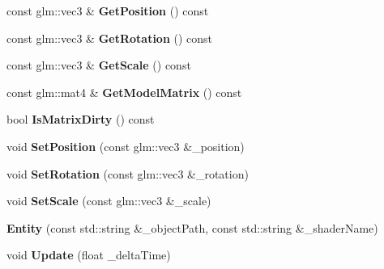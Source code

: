 \begin{DoxyCompactItemize}
\item 
\mbox{\label{classpiolot_1_1_entity_a9c38cdd359bfab2de36e2478d368a27e}} 
const glm\+::vec3 \& {\bfseries Get\+Position} () const
\item 
\mbox{\label{classpiolot_1_1_entity_a4cd721f2ff085908999d9c100bbaf214}} 
const glm\+::vec3 \& {\bfseries Get\+Rotation} () const
\item 
\mbox{\label{classpiolot_1_1_entity_ac5530a0639da344c0e8f86c2176fa4a6}} 
const glm\+::vec3 \& {\bfseries Get\+Scale} () const
\item 
\mbox{\label{classpiolot_1_1_entity_a6b0a54f38fa54989ad1c237d40fabcb0}} 
const glm\+::mat4 \& {\bfseries Get\+Model\+Matrix} () const
\item 
\mbox{\label{classpiolot_1_1_entity_a025d60f0f6de447381d9ab2211986075}} 
bool {\bfseries Is\+Matrix\+Dirty} () const
\item 
\mbox{\label{classpiolot_1_1_entity_af80fc92eb9232113046c602d5daa1a76}} 
void {\bfseries Set\+Position} (const glm\+::vec3 \&\+\_\+position)
\item 
\mbox{\label{classpiolot_1_1_entity_ae2d789ed80e63f1bcad90d003ea15e94}} 
void {\bfseries Set\+Rotation} (const glm\+::vec3 \&\+\_\+rotation)
\item 
\mbox{\label{classpiolot_1_1_entity_a16d7b329d92ebdc78178e460c7cee6dc}} 
void {\bfseries Set\+Scale} (const glm\+::vec3 \&\+\_\+scale)
\item 
\mbox{\label{classpiolot_1_1_entity_ae7fc7ed3219c928da4bce17e1e504733}} 
{\bfseries Entity} (const std\+::string \&\+\_\+object\+Path, const std\+::string \&\+\_\+shader\+Name)
\item 
\mbox{\label{classpiolot_1_1_entity_a35aed98e4aedd0aa64ee512f83d912ec}} 
void {\bfseries Update} (float \+\_\+delta\+Time)
\item 
\mbox{\label{classpiolot_1_1_entity_a9b7f0caf16313208ca115504a2453a12}} 

\end{DoxyCompactItemize}
